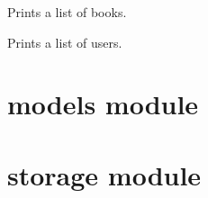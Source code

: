 \documentclass[letterpaper,10pt,english,openany,oneside]{sphinxmanual}
\begin{document}
\begin{fulllineitems}
\label{\detokenize{main:main.main}}
\pysigstartsignatures
{}
\pysigstopsignatures
\end{fulllineitems}


\begin{fulllineitems}
\label{\detokenize{main:main.print_books}}
\pysigstartsignatures
{}
\pysigstopsignatures
\sphinxAtStartPar
Prints a list of books.

\end{fulllineitems}


\begin{fulllineitems}
\label{\detokenize{main:main.print_users}}
\pysigstartsignatures
{}
\pysigstopsignatures
\sphinxAtStartPar
Prints a list of users.

\end{fulllineitems}


\sphinxstepscope


\section{models module}
\label{\detokenize{models:module-models}}\label{\detokenize{models:models-module}}\label{\detokenize{models::doc}}
\sphinxstepscope


\section{storage module}
\label{\detokenize{storage:module-storage}}\label{\detokenize{storage:storage-module}}\label{\detokenize{storage::doc}}
\end{document}
